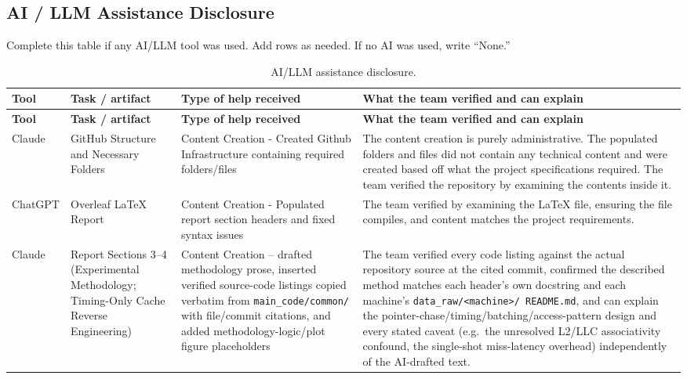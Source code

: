 \documentclass{article}
\begin{document}
\subsection{AI / LLM Assistance Disclosure}

Complete this table if any AI/LLM tool was used. Add rows as needed. If no AI was used, write ``None.''

\begin{longtable}{|p{3cm}|p{3.5cm}|p{4cm}|p{4.5cm}|}
\caption{AI/LLM assistance disclosure.}
\label{tab:ai-disclosure} \\

\hline
\textbf{Tool} &
\textbf{Task / artifact} &
\textbf{Type of help received} &
\textbf{What the team verified and can explain} \\
\hline
\endfirsthead

\hline
\textbf{Tool} &
\textbf{Task / artifact} &
\textbf{Type of help received} &
\textbf{What the team verified and can explain} \\
\hline
\endhead

Claude &
GitHub Structure and Necessary Folders &
Content Creation - Created Github Infrastructure containing required folders/files &
The content creation is purely administrative. The populated folders and files did not contain any technical content and were created based off what the project specifications required. The team verified the repository by examining the contents inside it.\\
\hline

ChatGPT &
Overleaf LaTeX Report
& Content Creation - Populated report section headers and fixed syntax issues
& The team verified by examining the LaTeX file, ensuring the file compiles, and content matches the project requirements.\\
\hline

Claude &
Report Sections 3--4 (Experimental Methodology; Timing-Only Cache Reverse Engineering) &
Content Creation -- drafted methodology prose, inserted verified source-code listings copied verbatim from \texttt{main\_code/common/} with file/commit citations, and added methodology-logic/plot figure placeholders &
The team verified every code listing against the actual repository source at the cited commit, confirmed the described method matches each header's own docstring and each machine's \texttt{data\_raw/<machine>/ README.md}, and can explain the pointer-chase/timing/batching/access-pattern design and every stated caveat (e.g.\ the unresolved L2/LLC associativity confound, the single-shot miss-latency overhead) independently of the AI-drafted text.\\
\hline

\end{longtable}
\end{document}

